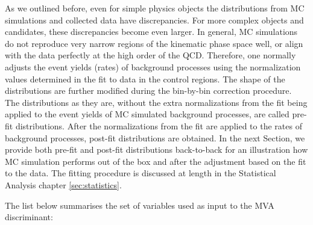 As we outlined before, even for simple physics objects the distributions from MC simulations and collected data have discrepancies. For more complex objects and candidates, these discrepancies become even larger. In general, MC simulations do not reproduce very narrow regions of the kinematic phase space well, or align with the data perfectly at the high order of the QCD. Therefore, one normally adjusts the event yields (rates) of background processes using the normalization values determined in the fit to data in the control regions. The shape of the distributions are further modified during the bin-by-bin correction procedure. The distributions as they are, without the extra normalizations from the fit being applied to the event yields of MC simulated background processes, are called pre-fit distributions. After the normalizations from the fit are applied to the rates of background processes, post-fit distributions are obtained. In the next Section, we provide both pre-fit and post-fit distributions back-to-back for an illustration how MC simulation performs out of the box and after the adjustment based on the fit to the data. The fitting procedure is discussed at length in the Statistical Analysis chapter \ref{sec:statistics}. 

The list below summarises the set of variables used as input to the MVA discriminant:

